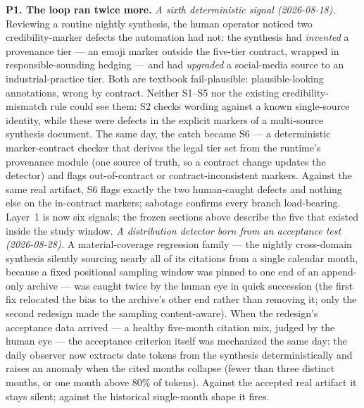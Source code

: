 \documentclass[11pt]{article}
\begin{document}
\textbf{P1. The loop ran twice more.} \emph{A sixth deterministic
signal (2026-08-18).} Reviewing a routine nightly synthesis, the human
operator noticed two credibility-marker defects the automation had not:
the synthesis had \emph{invented} a provenance tier --- an emoji marker
outside the five-tier contract, wrapped in responsible-sounding hedging
--- and had \emph{upgraded} a social-media source to an
industrial-practice tier. Both are textbook fail-plausible:
plausible-looking annotations, wrong by contract. Neither S1--S5 nor the
existing credibility-mismatch rule could see them: S2 checks wording
against a known single-source identity, while these were defects in the
explicit markers of a multi-source synthesis document. The same day, the
catch became S6 --- a deterministic marker-contract checker that derives
the legal tier set from the runtime's provenance module (one source of
truth, so a contract change updates the detector) and flags
out-of-contract or contract-inconsistent markers. Against the same real
artifact, S6 flags exactly the two human-caught defects and nothing else
on the in-contract markers; sabotage confirms every branch load-bearing.
Layer~1 is now six signals; the frozen sections above describe the five
that existed inside the study window.
\emph{A distribution detector born from an acceptance test
(2026-08-28).} A material-coverage regression family --- the nightly
cross-domain synthesis silently sourcing nearly all of its citations
from a single calendar month, because a fixed positional sampling window
was pinned to one end of an append-only archive --- was caught twice by
the human eye in quick succession (the first fix relocated the bias to
the archive's other end rather than removing it; only the second
redesign made the sampling content-aware). When the redesign's
acceptance data arrived --- a healthy five-month citation mix, judged by
the human eye --- the acceptance criterion itself was mechanized the
same day: the daily observer now extracts date tokens from the synthesis
deterministically and raises an anomaly when the cited months collapse
(fewer than three distinct months, or one month above 80\% of tokens).
Against the accepted real artifact it stays silent; against the
historical single-month shape it fires.
\end{document}
